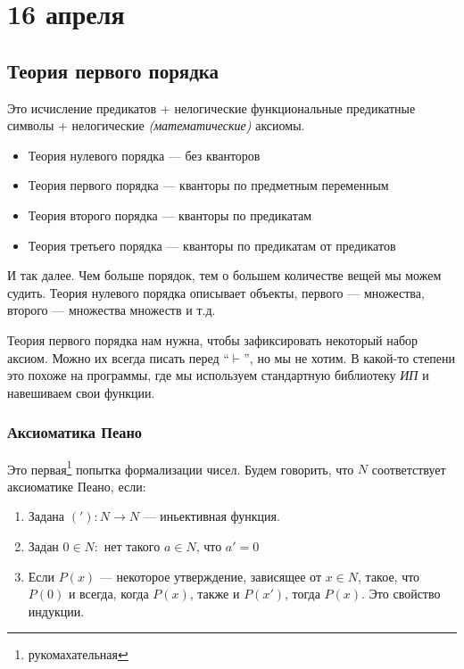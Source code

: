 \chapter{16 апреля}

\section{Теория первого порядка}

Это исчисление предикатов + нелогические функциональные предикатные символы + нелогические \textit{(математические)} аксиомы.

\begin{itemize}
    \item Теория нулевого порядка --- без кванторов
    \item Теория первого порядка --- кванторы по предметным переменным
    \item Теория второго порядка --- кванторы по предикатам
    \item Теория третьего порядка --- кванторы по предикатам от предикатов
\end{itemize}
И так далее. Чем больше порядок, тем о большем количестве вещей мы можем судить. Теория нулевого порядка описывает объекты, первого --- множества, второго --- множества множеств и т.д.

Теория первого порядка нам нужна, чтобы зафиксировать некоторый набор аксиом. Можно их всегда писать перед ``\(\vdash\)'', но мы не хотим. В какой-то степени это похоже на программы, где мы используем стандартную библиотеку \textit{ИП} и навешиваем свои функции.

\subsection{Аксиоматика Пеано}

Это первая\footnote{рукомахательная} попытка формализации чисел. Будем говорить, что \(N\) соответствует аксиоматике Пеано, если:
\begin{enumerate}
    \item Задана \(('): N \to N\) --- иньективная функция.
    \item Задан \(0 \in N : \) нет такого \(a \in N\), что \(a' = 0\)
    \item Если \(P(x)\) --- некоторое утверждение, зависящее от \(x \in N\), такое, что \(P(0)\) и всегда, когда \(P(x)\), также и \(P(x')\), тогда \(P(x)\). Это свойство индукции.
\end{enumerate}

